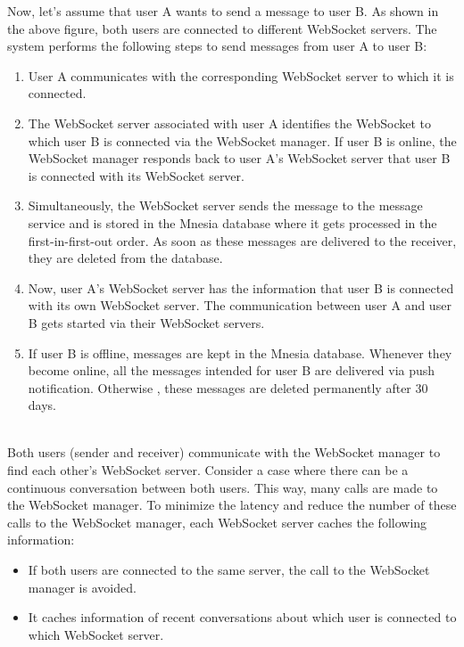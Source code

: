 Now, let's assume that user A wants to send a message to user B. As shown in the above figure, both users are connected to different WebSocket servers. The system performs the following steps to send messages from user A to user B:

\begin{enumerate}
\item
\protect{}\label{C739fo-IAtOG1oFt_tjcR}
User A communicates with the corresponding WebSocket server to which it is connected.
\item
\protect{}\label{_PSV7VzHk0OqEjOfinwVC}
The WebSocket server associated with user A identifies the WebSocket to which user B is connected via the WebSocket manager. If user B is online, the WebSocket manager responds back to user A's WebSocket server that user B is connected with its WebSocket server.
\item
\protect{}\label{S0lsF3dHKajijaF1qMew1}
Simultaneously, the WebSocket server sends the message to the message service and is stored in the Mnesia database where it gets processed in the first-in-first-out order. As soon as these messages are delivered to the receiver, they are deleted from the database.
\item
\protect{}\label{l3JiqlomLu5LZ5iea5fM5}
Now, user A's WebSocket server has the information that user B is connected with its own WebSocket server. The communication between user A and user B gets started via their WebSocket servers.
\item
\protect{}\label{BIblNs8warpGChgVEm0tO}
If user B is offline, messages are kept in the Mnesia database. Whenever they become online, all the messages intended for user B are delivered via push notification. Otherwise , these messages are deleted permanently after 30 days.
\end{enumerate}
\\
Both users (sender and receiver) communicate with the WebSocket manager to find each other's WebSocket server. Consider a case where there can be a continuous conversation between both users. This way, many calls are made to the WebSocket manager. To minimize the latency and reduce the number of these calls to the WebSocket manager, each WebSocket server caches the following information:

\begin{itemize}
\item
\protect{}\label{UF8dDofR_ouBJHLFxPYLa}
If both users are connected to the same server, the call to the WebSocket manager is avoided.
\item
\protect{}\label{TUIDQKWF5EbCAZBn73DpU}
It caches information of recent conversations about which user is connected to which WebSocket server.
\end{itemize}

